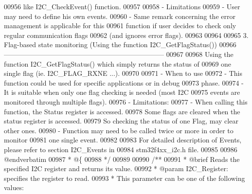 \begin{DoxyCode}
00956 \textcolor{comment}{               like I2C\_CheckEvent() function.}
00957 \textcolor{comment}{}
00958 \textcolor{comment}{          - Limitations}
00959 \textcolor{comment}{             - User may need to define his own events.}
00960 \textcolor{comment}{             - Same remark concerning the error management is applicable for this }
00961 \textcolor{comment}{               function if user decides to check only regular communication flags }
00962 \textcolor{comment}{               (and ignores error flags).}
00963 \textcolor{comment}{      }
00964 \textcolor{comment}{ }
00965 \textcolor{comment}{     3. Flag-based state monitoring (Using the function I2C\_GetFlagStatus())}
00966 \textcolor{comment}{     -----------------------------------------------------------------------}
00967 \textcolor{comment}{     }
00968 \textcolor{comment}{      Using the function I2C\_GetFlagStatus() which simply returns the status of }
00969 \textcolor{comment}{      one single flag (ie. I2C\_FLAG\_RXNE ...). }
00970 \textcolor{comment}{}
00971 \textcolor{comment}{          - When to use}
00972 \textcolor{comment}{             - This function could be used for specific applications or in debug }
00973 \textcolor{comment}{               phase.}
00974 \textcolor{comment}{             - It is suitable when only one flag checking is needed (most I2C }
00975 \textcolor{comment}{               events are monitored through multiple flags).}
00976 \textcolor{comment}{          - Limitations: }
00977 \textcolor{comment}{             - When calling this function, the Status register is accessed. }
00978 \textcolor{comment}{               Some flags are cleared when the status register is accessed. }
00979 \textcolor{comment}{               So checking the status of one Flag, may clear other ones.}
00980 \textcolor{comment}{             - Function may need to be called twice or more in order to monitor }
00981 \textcolor{comment}{               one single event.}
00982 \textcolor{comment}{ }
00983 \textcolor{comment}{   For detailed description of Events, please refer to section I2C\_Events in }
00984 \textcolor{comment}{   stm32f4xx\_i2c.h file.}
00985 \textcolor{comment}{       }
00986 \textcolor{comment}{@endverbatim}
00987 \textcolor{comment}{  * @\{}
00988 \textcolor{comment}{  */}
00989 
00990 \textcolor{comment}{/**}
00991 \textcolor{comment}{  * @brief  Reads the specified I2C register and returns its value.}
00992 \textcolor{comment}{  * @param  I2C\_Register: specifies the register to read.}
00993 \textcolor{comment}{  *          This parameter can be one of the following values:}

\end{DoxyCode}
